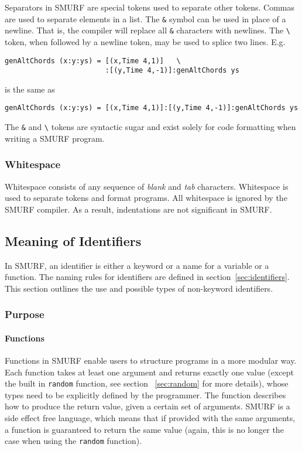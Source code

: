 Separators in SMURF are special tokens used to separate other tokens. 
Commas are used to separate elements in a list.
The \texttt{\&} symbol can be used in place of a newline. That is, the compiler
will replace all \texttt{\&} characters with newlines. The
\texttt{\textbackslash} token, when followed by a newline token,
may be used to splice two lines. E.g.
\begin{lstlisting}
genAltChords (x:y:ys) = [(x,Time 4,1)]   \
                        :[(y,Time 4,-1)]:genAltChords ys
\end{lstlisting}
is the same as 
\begin{lstlisting}
genAltChords (x:y:ys) = [(x,Time 4,1)]:[(y,Time 4,-1)]:genAltChords ys
\end{lstlisting}

The \texttt{\&} and \texttt{\textbackslash} tokens are syntactic sugar and exist solely for code formatting when writing a SMURF program.

\subsubsection{Whitespace}
\label{sec:whitespaces}
Whitespace consists of any sequence of {\it blank} and {\it tab} characters.
Whitespace is used to
separate tokens and format programs. All whitespace is ignored by the
SMURF compiler. As a result, indentations are not significant in SMURF.

\subsection{Meaning of Identifiers}
In SMURF, an identifier is either a keyword or a name for a variable or a function. 
The naming rules for identifiers are defined in section~\ref{sec:identifiers}. This section outlines
the use and possible types of non-keyword identifiers.


\subsubsection{Purpose}
\paragraph{Functions}
Functions in SMURF enable users to structure programs in a more modular way. 
Each function takes at least one argument and returns exactly one value (except the built in \texttt{random} function, see section
~\ref{sec:random} for more details), whose types need to be 
explicitly defined by the programmer. The function describes how to produce the return value,
given a certain set of arguments.
SMURF is a side effect free language, which means
that if provided with the same arguments, a function is guaranteed to return the same value (again, this is no longer the case
when using the \texttt{random} function). 


